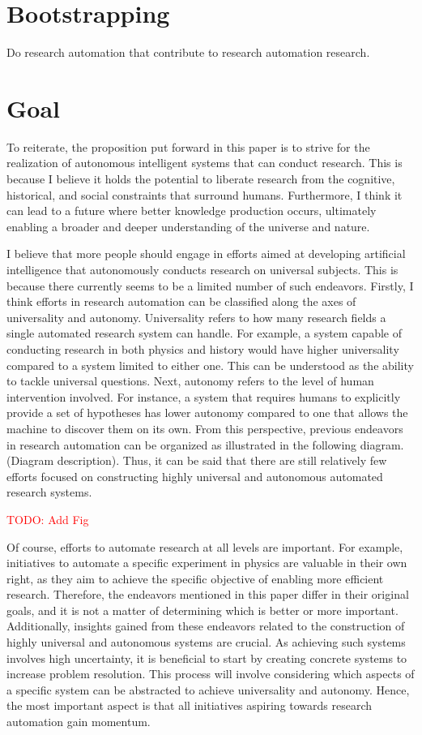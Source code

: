 \documentclass{book}
\begin{document}
\section{Bootstrapping}
Do research automation that contribute to research automation research.

\section{Goal}
To reiterate, the proposition put forward in this paper is to strive for the realization of autonomous intelligent systems that can conduct research. This is because I believe it holds the potential to liberate research from the cognitive, historical, and social constraints that surround humans. Furthermore, I think it can lead to a future where better knowledge production occurs, ultimately enabling a broader and deeper understanding of the universe and nature.

I believe that more people should engage in efforts aimed at developing artificial intelligence that autonomously conducts research on universal subjects. This is because there currently seems to be a limited number of such endeavors. Firstly, I think efforts in research automation can be classified along the axes of universality and autonomy. Universality refers to how many research fields a single automated research system can handle. For example, a system capable of conducting research in both physics and history would have higher universality compared to a system limited to either one. This can be understood as the ability to tackle universal questions. Next, autonomy refers to the level of human intervention involved. For instance, a system that requires humans to explicitly provide a set of hypotheses has lower autonomy compared to one that allows the machine to discover them on its own. From this perspective, previous endeavors in research automation can be organized as illustrated in the following diagram. (Diagram description). Thus, it can be said that there are still relatively few efforts focused on constructing highly universal and autonomous automated research systems.

\textcolor{red}{TODO: Add Fig}

Of course, efforts to automate research at all levels are important. For example, initiatives to automate a specific experiment in physics are valuable in their own right, as they aim to achieve the specific objective of enabling more efficient research. Therefore, the endeavors mentioned in this paper differ in their original goals, and it is not a matter of determining which is better or more important. Additionally, insights gained from these endeavors related to the construction of highly universal and autonomous systems are crucial. As achieving such systems involves high uncertainty, it is beneficial to start by creating concrete systems to increase problem resolution. This process will involve considering which aspects of a specific system can be abstracted to achieve universality and autonomy. Hence, the most important aspect is that all initiatives aspiring towards research automation gain momentum.
\end{document}
